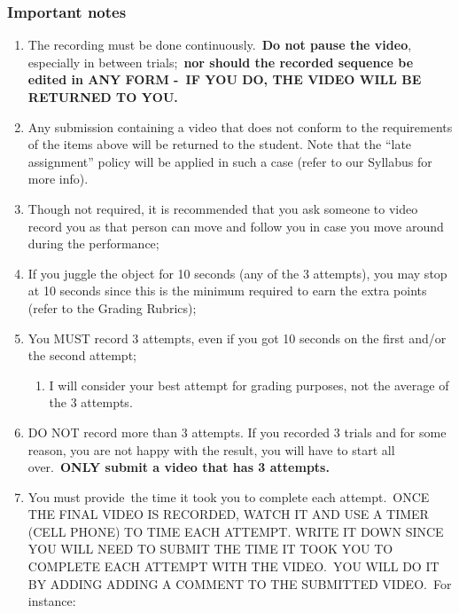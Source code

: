 \documentclass[
  letterpaper,
  DIV=11,
  numbers=noendperiod]{scrartcl}
\providecommand{\tightlist}{%
  \setlength{\itemsep}{0pt}\setlength{\parskip}{0pt}}\usepackage{longtable,booktabs,array}
\begin{document}
\hypertarget{important-notes}{%
\subsubsection{Important notes}\label{important-notes}}

\begin{enumerate}
\def\labelenumi{\arabic{enumi}.}
\tightlist
\item
  The recording must be done continuously.~\textbf{Do not pause the
  video}, especially in between trials;~\textbf{nor should the recorded
  sequence be edited in ANY FORM -~IF YOU DO, THE VIDEO WILL BE RETURNED
  TO YOU.}
\item
  Any submission containing a video that does not conform to the
  requirements of the items above will be returned to the student. Note
  that the ``late assignment'' policy will be applied in such a case
  (refer to our Syllabus for more info).~
\item
  Though not required, it is recommended that you ask someone to video
  record you as that person can move and follow you in case you move
  around during the performance;
\item
  If you juggle the object for 10 seconds (any of the 3 attempts), you
  may stop at 10 seconds since this is the minimum required to earn the
  extra points (refer to the Grading Rubrics);
\item
  You MUST record 3 attempts, even if you got 10 seconds on the first
  and/or the second attempt;

  \begin{enumerate}
  \def\labelenumii{\arabic{enumii}.}
  \tightlist
  \item
    I will consider your best attempt for grading purposes, not the
    average of the 3 attempts.
  \end{enumerate}
\item
  DO NOT record more than 3 attempts. If you recorded 3 trials and for
  some reason, you are not happy with the result, you will have to start
  all over.~\textbf{ONLY submit a video that has 3 attempts.}
\item
  You must provide~the time it took you to complete each attempt.~ONCE
  THE FINAL VIDEO IS RECORDED, WATCH IT AND USE A TIMER (CELL PHONE) TO
  TIME EACH ATTEMPT. WRITE IT DOWN SINCE YOU WILL NEED TO SUBMIT THE
  TIME IT TOOK YOU TO COMPLETE EACH ATTEMPT WITH THE VIDEO.~YOU WILL DO
  IT BY ADDING ADDING A COMMENT TO THE SUBMITTED VIDEO.~For instance:


\end{enumerate}
\end{document}
